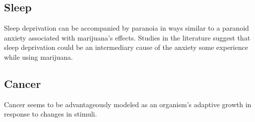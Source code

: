 \documentclass{book}
\begin{document}
\subsection{Sleep}
Sleep deprivation can be accompanied by paranoia in ways similar to a paranoid anxiety associated with marijuana's effects.
Studies in the literature suggest that sleep deprivation could be an intermediary cause of the anxiety some experience while using marijuana.

\subsection{Cancer}
Cancer seems to be advantageously modeled as an organism's adaptive growth in response to changes in stimuli.
\end{document}
